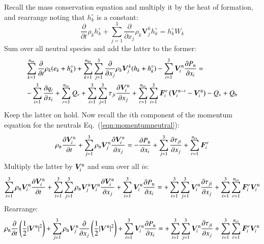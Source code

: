 \documentclass{warpdoc}
\newcommand{\alb}{\vspace{0.1cm}\\} %
\newcommand{\mfd}{\displaystyle}
\newcommand{\nns}{{n_{\rm ns}}}
\newcommand{\ncs}{{n_{\rm cs}}}
\renewcommand{\vec}[1]{\bm{#1}}
\begin{document}
%  
Recall the mass conservation equation and multiply it by the heat of formation, and rearrange noting that $h_k^\circ$ is a constant:
%
\begin{equation}
 \frac{\partial }{\partial t}\rho_k h_k^\circ + \sum_{j=1}^3  \frac{\partial }{\partial x_j} \rho_k \vec{V}^k_j h_k^\circ 
=  h_k^\circ W_k
\end{equation}
%  
Sum over all neutral species and add the latter to the former:
%
\begin{equation}
\begin{array}{l}\mfd
 \sum_{k=1}^\nns\frac{\partial }{\partial t}\rho_k (e_k+h_k^\circ) + \sum_{k=1}^\nns\sum_{j=1}^3  \frac{\partial }{\partial x_j} \rho_k \vec{V}^k_j (h_k+h_k^\circ) 
- \sum_{i=1}^3 \vec{V}^{\rm n}_i \frac{\partial P_{\rm n}}{\partial x_i}
= \alb\mfd
-\sum_{i=1}^{3}\frac{\partial q_i}{\partial x_i}
+\sum_{r=1}^{\ncs} Q_{r}
+\sum_{i=1}^3 \sum_{j=1}^3 \tau_{ji} \frac{\partial \vec{V}_i^{\rm n}}{\partial x_j}
+ \sum_{r=1}^\ncs \sum_{i=1}^3 \vec{F}_i^{r} \left( \vec{V}_i^{{\rm n}-r}-\vec{V}_i^{\rm n} \right)
-  Q_{\rm v}
+ Q_{\rm b}
\end{array}
\label{eqn:eneutrals4}
\end{equation}
%  
Keep the latter on hold. Now recall the $i$th component of the momentum equation for the neutrals Eq.\ (\ref{eqn:momentumneutral}):
%
\begin{equation}
  \rho_{\rm n} \frac{\partial \vec{V}_i^{\rm n} }{\partial t}+ \sum_{j=1}^3 \rho_{\rm n} \vec{V}_j^{\rm n} \frac{\partial \vec{V}_i^{\rm n}}{\partial x_j}
=
-\frac{\partial P_{\rm n}}{\partial x_i} 
+ \sum_{j=1}^3 \frac{\partial \tau_{ji}}{\partial x_j}
+ \sum_{r=1}^\ncs \vec{F}_i^r
\end{equation}
%
Multiply the latter by $\vec{V}_i^{\rm n}$ and sum over all $i$s:
%
\begin{equation}
  \sum_{i=1}^3 \rho_{\rm n} \vec{V}_i^{\rm n} \frac{\partial \vec{V}_i^{\rm n} }{\partial t}
+ \sum_{i=1}^3 \sum_{j=1}^3 \rho_{\rm n} \vec{V}_j^{\rm n} \vec{V}_i^{\rm n} \frac{\partial \vec{V}_i^{\rm n}}{\partial x_j}
+ \sum_{i=1}^3 \vec{V}_i^{\rm n} \frac{\partial P_{\rm n}}{\partial x_i} 
=
+ \sum_{i=1}^3 \sum_{j=1}^3 \vec{V}_i^{\rm n} \frac{\partial \tau_{ji}}{\partial x_j}
+ \sum_{i=1}^3 \sum_{r=1}^\ncs \vec{F}_i^r \vec{V}_i^{\rm n}
\end{equation}
%
Rearrange:
%
\begin{equation}
   \rho_{\rm n}  \frac{\partial  }{\partial t}\left(\frac{1}{2}|\vec{V}^{\rm n}|^2\right)
+  \sum_{j=1}^3 \rho_{\rm n} \vec{V}_j^{\rm n}  \frac{\partial }{\partial x_j}\left(\frac{1}{2}|\vec{V}^{\rm n}|^2\right)
+ \sum_{i=1}^3 \vec{V}_i^{\rm n} \frac{\partial P_{\rm n}}{\partial x_i} 
=
+ \sum_{i=1}^3 \sum_{j=1}^3 \vec{V}_i^{\rm n} \frac{\partial \tau_{ji}}{\partial x_j}
+ \sum_{i=1}^3 \sum_{r=1}^\ncs \vec{F}_i^r \vec{V}_i^{\rm n}
\label{eqn:eneutrals5}
\end{equation}
\end{document}

